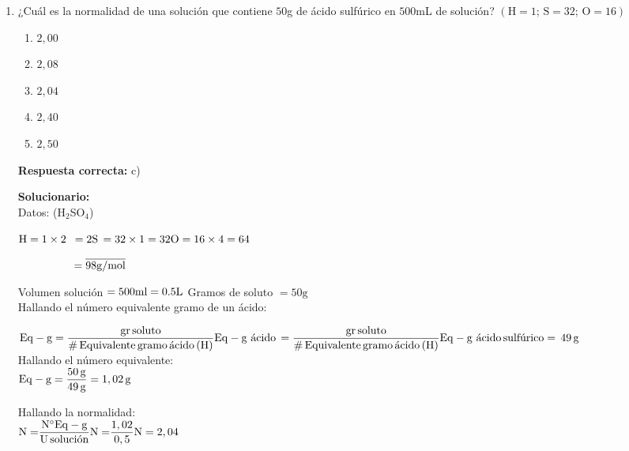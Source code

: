 \begin{enumerate}
	
	\item ¿Cuál es la normalidad de una solución que contiene $50$g de ácido sulfúrico en $500$mL de solución?
	\newline
	$(\text{H}=1;\,\text{S}=32;\,\text{O}=16)$
	
	\begin{enumerate}[label=\alph*)]
		\item $2,00$
		\item $2,08$
		\item $2,04$
		\item $2,40$
		\item $2,50$
	\end{enumerate}
	
	\textbf{Respuesta correcta:} c)
	
	\vspace{2mm}
	\textbf{Solucionario:}\\
	
	Datos: (H$_2$SO$_4$)
	
	$\text{H}=1\times2\,\,\,=2\\
	\text{S}\,=32\times1=32\\
	\text{O}=16\times4=64$
	
	$\,\,\,\,\,\,\,\,\,\,\,\,\,\,\,\,\,\,\,\,\,\,\,\,\,\,\,\,\,\,=\overline {{\rm{98 g/mol}}}\\$
	
	Volumen solución $=500\text{ml}=0.5\text{L}\\$
	Gramos de soluto $=50\text{g}$\\
	
	Hallando el número equivalente gramo de un ácido:
	
	${\rm{Eq}} - {\rm{g}} = \dfrac{{{\rm{gr}}\,{\rm{soluto}}}}{{{\rm{\# }}\,{\rm{Equivalente}}\,{\rm{gramo}}\,{\rm{\text{ácido}}}\,{\rm{(H)}}}}\\\\
	{\rm{Eq}} - {\rm{g}}\,\,{\rm{\text{ácido}}}\, = \dfrac{{{\rm{gr}}\,{\rm{soluto}}}}{{{\rm{\# }}\,{\rm{Equivalente}}\,{\rm{gramo}}\,{\rm{\text{ácido}}}\,{\rm{(H)}}}}\\\\
	{\rm{Eq}} - {\rm{g}}\,\,{\rm{\text{ácido}}}\,{\rm{\text{sulfúrico}}} = \,49\,{\rm{g}}$\\
	
	Hallando el número equivalente:\\
	${\rm{Eq}} - {\rm{g}} = \dfrac{{50\,{\rm{g}}}}{{49\,{\rm{g}}}} = 1,02\,{\rm{g}}$
	
	Hallando la normalidad:\\
	
	${\rm{N = }}\dfrac{{{\rm{N^\circ  Eq}} - {\rm{g}}}}{{{\rm{U}}\,{\rm{\text{solución}}}}}\\\\
	{\rm{N = }}\dfrac{{1,02}}{{{\rm{0,5}}}}\\\\
	{\rm{N = 2,04}}$
	
	
	
\end{enumerate}


